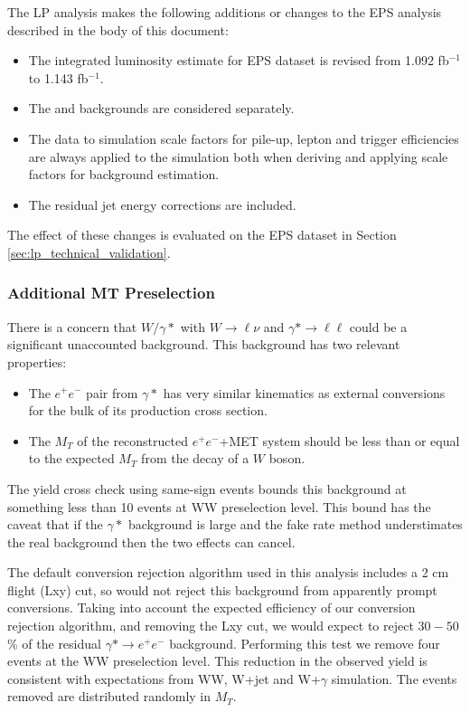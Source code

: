 
The LP analysis makes the following additions or changes to the EPS analysis
described in the body of this document:

\begin{itemize}
    \item The integrated luminosity estimate for EPS dataset is revised from 1.092 fb$^{-1}$ to 1.143 fb$^{-1}$.
    \item The \dytt and \dyll backgrounds are considered separately.
    \item The data to simulation scale factors for pile-up, lepton and trigger efficiencies are 
always applied to the simulation both when deriving and applying scale factors for background estimation.
    \item The residual jet energy corrections are included.
\end{itemize}

The effect of these changes is evaluated on the EPS dataset in Section \ref{sec:lp_technical_validation}.

\subsubsection{Additional MT Preselection}

There is a concern that $W/\gamma*$ with $W\rightarrow \ell\nu$ 
and $\gamma*\rightarrow\ell\ell$ could be a significant unaccounted background.
This background has two relevant properties:

\begin{itemize}
    \item The $e^{+}e^{-}$ pair from $\gamma*$ has very similar kinematics as external
   conversions for the bulk of its production cross section.
    \item The $M_T$ of the reconstructed $e^{+}e^{-}$+MET system should be less than
    or equal to the expected $M_T$ from the decay of a $W$ boson.
\end{itemize}

The yield cross check using same-sign events bounds this background 
at something less than 10 events at WW preselection level.  
This bound has the caveat that if the $\gamma*$ background is large and the 
fake rate method understimates the real background then the two
effects can cancel.

The default conversion rejection algorithm used in this analysis
includes a 2 cm flight (Lxy) cut, so would not reject this background
from apparently prompt conversions.
Taking into account the expected efficiency of our conversion
rejection algorithm, and removing the Lxy cut, 
we would expect to reject $30-50$\% of the residual 
$\gamma*\rightarrow e^{+}e^{-}$ background.
Performing this test we remove four events at the WW preselection level.
This reduction in the observed yield is consistent with expectations
from WW, W+jet and W+$\gamma$ simulation.
The events removed are distributed randomly in $M_T$.

